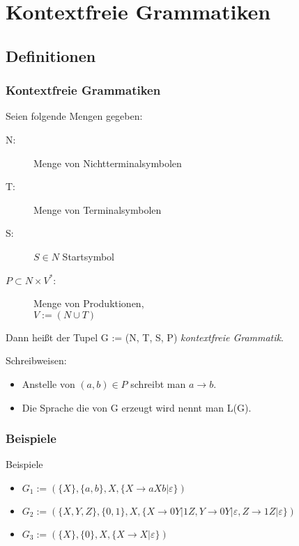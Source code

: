 \section{Kontextfreie Grammatiken}
\subsection{Definitionen}
\begin{frame}
  \frametitle{Kontextfreie Grammatiken}
  \begin{definition}
    Seien folgende Mengen gegeben:
    \begin{description}
      \item[N:] Menge von Nichtterminalsymbolen
      \item[T:] Menge von Terminalsymbolen
      \item[S:] $S \in N$ Startsymbol
      \item[$P \subset N \times V^*$:] Menge von Produktionen, \\
      $V := (N \cup T)$
    \end{description}
    Dann heißt der Tupel G := (N, T, S, P) \emph{kontextfreie Grammatik}.
  \end{definition}\pause
  Schreibweisen:
  \begin{itemize}
    \item Anstelle von $(a, b) \in P$ schreibt man $a \longrightarrow b$.
    \item Die Sprache die von G erzeugt wird nennt man L(G).
  \end{itemize}
\end{frame}

\begin{frame}
  \frametitle{Beispiele}
  \begin{exampleblock}{Beispiele}
    \begin{itemize}
      \item $G_1 := (\{X\}, \{a, b\}, X, \{X \longrightarrow aXb | \varepsilon\})$
      \item $G_2 := (\{X, Y, Z\}, \{0, 1\}, X, \{X \longrightarrow 0Y | 1Z, Y \longrightarrow 0Y|\varepsilon, Z \longrightarrow 1Z|\varepsilon\})$
       \item $G_3 := (\{X\}, \{0\}, X, \{X \longrightarrow X | \varepsilon\})$
    \end{itemize}
  \end{exampleblock}
\end{frame}

